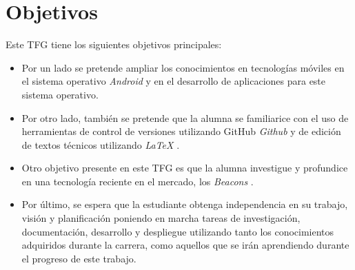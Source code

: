 %
%
%
%


\chapter{Objetivos} \label{chap:Objetivos}  

Este TFG tiene los siguientes objetivos principales:

	
\begin{itemize}
\item  	Por un lado se pretende ampliar los conocimientos en tecnologías móviles en el sistema operativo \textit{Android} \cite{URL::Android} y en el desarrollo de aplicaciones para este sistema operativo.
\item Por otro lado, también se pretende que la alumna se familiarice con el uso de herramientas de control de versiones utilizando GitHub \textit{Github} \cite{URL::Github} y de edición de textos técnicos utilizando \textit{LaTeX}  \cite{URL::LaTeX}.
\item Otro objetivo presente en este TFG es que la alumna investigue y profundice en una tecnología reciente en el mercado, los \textit{Beacons} \cite{URL::Beacon}.
\item  Por último, se espera que la estudiante obtenga independencia en su trabajo, visión y planificación poniendo en marcha tareas de investigación, documentación, desarrollo y despliegue utilizando tanto los conocimientos adquiridos durante la carrera, como aquellos que se irán aprendiendo durante el progreso de este trabajo.
\end{itemize}